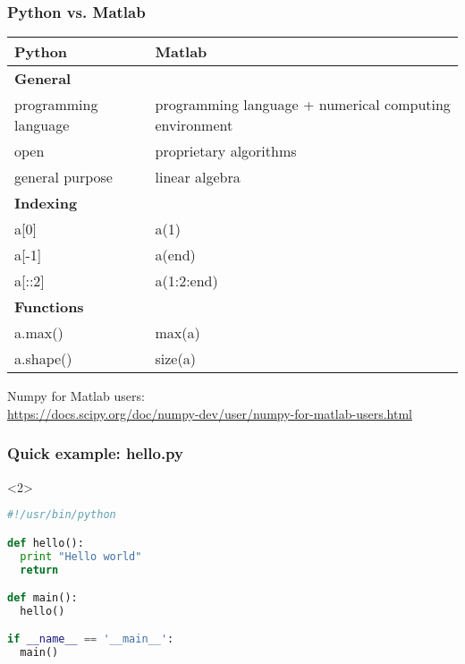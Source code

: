 \begin{frame}[fragile]
\frametitle{Python vs. Matlab}
\footnotesize

\begin{table}
\scriptsize
\begin{tabular}{p{}p{}}
\toprule
Python  	  				& Matlab\\
\midrule
\textbf{General}			& \\
programming language		& programming language + numerical computing environment\\
open						& proprietary algorithms\\
general purpose				& linear algebra\\
\midrule
\textbf{Indexing} 			& 	\\
a[0]						& a(1) \\
a[-1]						& a(end)\\
a[::2]						& a(1:2:end)\\
\midrule
\textbf{Functions}			& \\
a.max()						& max(a)\\
a.shape()					& size(a)\\
\bottomrule
\end{tabular}
\end{table}

\vfill

Numpy for Matlab users:\\
\url{https://docs.scipy.org/doc/numpy-dev/user/numpy-for-matlab-users.html}

\end{frame}


\begin{frame}[t, fragile]
\frametitle{Quick example: hello.py}
\huge

\faLaptop


\begin{onlyenv}<2>
\begin{lstlisting}[language=python]
#!/usr/bin/python

def hello():
  print "Hello world"
  return

def main():
  hello()

if __name__ == '__main__':
  main()
\end{lstlisting}

\end{onlyenv}
\end{frame}

